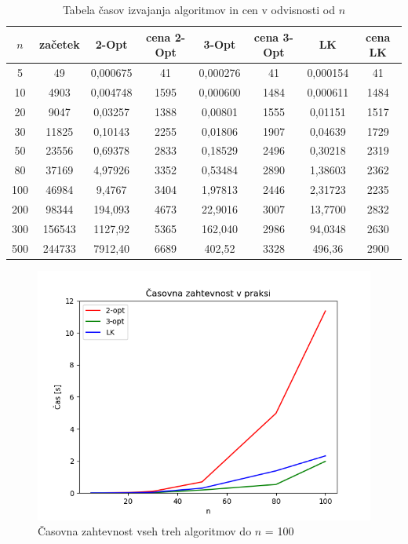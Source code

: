 \documentclass[8pt]{beamer}
\begin{document}
\begin{frame}
\begin{table}[!h]
\begin{tabular}{|c|c|c|c|c|c|c|c|}
\hline
$n$&začetek&2-Opt&cena 2-Opt&3-Opt&cena 3-Opt&LK&cena LK\\\hline
5&49&0,000675&41&0,000276&41&0,000154&41\\\hline
10&4903&0,004748&1595&0,000600&1484&0,000611&1484\\\hline
20&9047&0,03257&1388&0,00801&1555&0,01151&1517\\\hline
30&11825&0,10143&2255&0,01806&1907&0,04639&1729\\\hline
50&23556&0,69378&2833&0,18529&2496&0,30218&2319\\\hline
80&37169&4,97926&3352&0,53484&2890&1,38603&2362\\\hline
100&46984&9,4767&3404&1,97813&2446&2,31723&2235\\\hline
200&98344&194,093&4673&22,9016&3007&13,7700&2832\\\hline
300&156543&1127,92&5365&162,040&2986&94,0348&2630\\\hline
500&244733&7912,40&6689&402,52&3328&496,36&2900\\\hline
\end{tabular}
\caption{Tabela časov izvajanja algoritmov in cen v odvisnosti od $n$}
\label{tabela_casov}
\end{table}
\end{frame}

\begin{frame}
\begin{figure}[!h]
 \begin{center}
  \includegraphics[width=12 cm]{casovna_zahtevnost_do_100.png}
  \caption{Časovna zahtevnost vseh treh algoritmov do $n$ = 100}
  \label{casovna_do_100}
\end{center}
\end{figure}
\end{frame}
\end{document}
